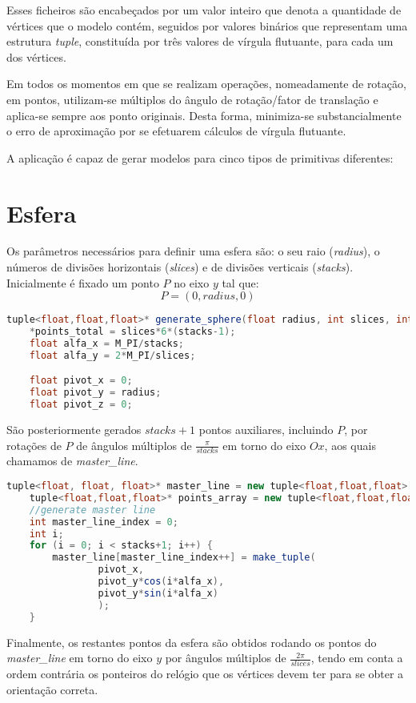 \documentclass[14pt, a4 paper]{report}
\begin{document}
Esses ficheiros são encabeçados por um valor inteiro que denota a quantidade de vértices que o modelo contém, seguidos por valores binários que representam uma estrutura \textit{tuple}, constituída por três valores de vírgula flutuante, para cada um dos vértices.

Em todos os momentos em que se realizam operações, nomeadamente de rotação, em pontos, utilizam-se múltiplos do ângulo de rotação/fator de translação e aplica-se sempre aos ponto originais. Desta forma, minimiza-se substancialmente o erro de aproximação por se efetuarem cálculos de vírgula flutuante.

A aplicação é capaz de gerar modelos para cinco tipos de primitivas diferentes:
\section{Esfera}
Os parâmetros necessários para definir uma esfera são: o seu raio (\textit{radius}), o números de divisões horizontais (\textit{slices}) e de divisões verticais (\textit{stacks}).
Inicialmente é fixado um ponto $P$ no eixo $y$ tal que:
$$
P = (0,radius,0)
$$

\begin{lstlisting}[language = java]
tuple<float,float,float>* generate_sphere(float radius, int slices, int stacks, int *points_total){
    *points_total = slices*6*(stacks-1);
    float alfa_x = M_PI/stacks;     
    float alfa_y = 2*M_PI/slices;

    float pivot_x = 0;
    float pivot_y = radius;
    float pivot_z = 0;
\end{lstlisting}

São posteriormente gerados $stacks+1$ pontos auxiliares, incluindo $P$, por rotações de $P$ de ângulos múltiplos de $\frac{\pi}{stacks}$ em torno do eixo $Ox$, aos quais chamamos de \textit{master\_line}.

\begin{lstlisting}[language = java]
    tuple<float, float, float>* master_line = new tuple<float,float,float>[stacks+1];
    tuple<float,float,float>* points_array = new tuple<float,float,float>[*points_total];
    //generate master line
    int master_line_index = 0;
    int i;
    for (i = 0; i < stacks+1; i++) {
        master_line[master_line_index++] = make_tuple(
                pivot_x,
                pivot_y*cos(i*alfa_x),
                pivot_y*sin(i*alfa_x)
                );
    }
\end{lstlisting}

Finalmente, os restantes pontos da esfera são obtidos rodando os pontos do \textit{master\_line} em torno do eixo $y$ por ângulos múltiplos de $\frac{2\pi}{slices}$, tendo em conta a ordem contrária os ponteiros do relógio que os vértices devem ter para se obter a orientação correta.
\end{document}

